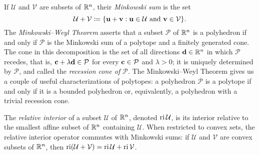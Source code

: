 \documentclass[11pt]{amsart}
\begin{document}
If $\mathcal{U}$ and $\mathcal{V}$ are subsets of $\mathbb{R}^n$, their \emph{Minkowski sum} is the set
\[\mathcal{U}+\mathcal{V} \coloneqq \{\mathbf{u}+\mathbf{v}: \mathbf{u}\in \mathcal{U}\text{ and }\mathbf{v}\in \mathcal{V}\}.\]
The \emph{Minkowski--Weyl Theorem} asserts that a subset $\mathcal{P}$ of $\mathbb{R}^n$ is a polyhedron if and only if $\mathcal{P}$ is the Minkowski sum of a polytope and a finitely generated cone.
The cone in this decomposition is the set of all directions $\mathbf{d} \in \mathbb{R}^n$ in which $\mathcal{P}$ recedes, that is, $\mathbf{c} + \lambda \mathbf{d} \in \mathcal{P}$ for every $\mathbf{c} \in \mathcal{P}$ and $\lambda > 0$; it is uniquely determined by $\mathcal{P}$, and called the \emph{recession cone of $\mathcal{P}$}.
The Minkowski--Weyl Theorem gives us a couple of useful characterizations of polytopes: a polyhedron $\mathcal{P}$ is a polytope if and only if it is a bounded polyhedron or, equivalently, a polyhedron with a trivial recession cone.

The \emph{relative interior} of a subset $\mathcal{U}$ of $\mathbb{R}^n$, denoted $\operatorname{ri} \mathcal{U}$, is its interior relative to the smallest affine subset of $\mathbb{R}^n$ containing $\mathcal{U}$.
When restricted to convex sets, the relative interior operator commutes with Minkowski sums: if $\mathcal{U}$ and $\mathcal{V}$ are convex subsets of $\mathbb{R}^n$, then $\operatorname{ri}(\mathcal{U}+\mathcal{V})=\operatorname{ri} \mathcal{U}+\operatorname{ri} \mathcal{V}$.
\end{document}
